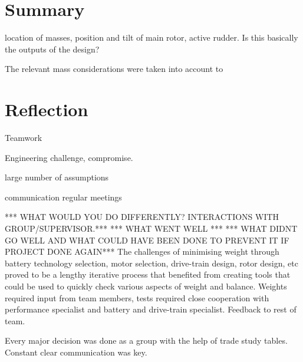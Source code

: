 \documentclass[11pt,a4paper]{article}
\begin{document}
\section{Summary}
location of masses, position and tilt of main rotor, active rudder. Is this basically the outputs of the design?

The relevant mass considerations were taken into account to 



\section{Reflection}

Teamwork

Engineering challenge, compromise.

large number of assumptions

communication
 regular meetings


*** WHAT WOULD YOU DO DIFFERENTLY? INTERACTIONS WITH GROUP/SUPERVISOR.***
*** WHAT WENT WELL ***
*** WHAT DIDNT GO WELL AND WHAT COULD HAVE BEEN DONE TO PREVENT IT IF PROJECT DONE AGAIN***
 The challenges of minimising weight through battery technology selection, motor selection, drive-train design, rotor design, etc proved to be a lengthy iterative process that benefited from creating tools that could be used to quickly check various aspects of weight and balance. 
Weights required input from team members, tests required close cooperation with performance specialist and battery and drive-train specialist. Feedback to rest of team.

Every major decision was done as a group with the help of trade study tables. Constant clear communication was key.
\end{document}
